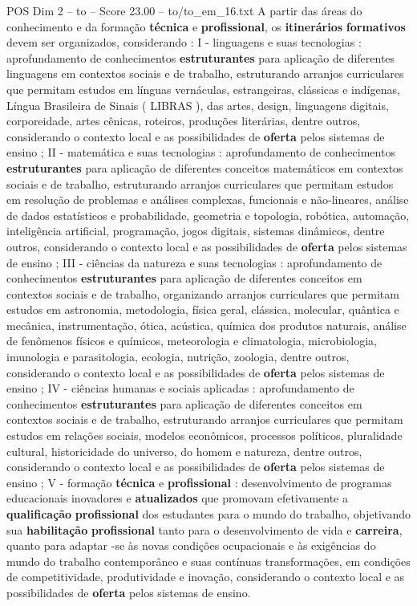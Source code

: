 \begin{textsample}{POS Dim 2 – to – Score 23.00 – to/to\_em\_16.txt}
A partir das áreas do conhecimento e da formação \textbf{técnica} e \textbf{profissional}, os \textbf{itinerários} \textbf{formativos} devem ser organizados, considerando : I - linguagens e suas tecnologias : aprofundamento de conhecimentos \textbf{estruturantes} para aplicação de diferentes linguagens em contextos sociais e de trabalho, estruturando arranjos curriculares que permitam estudos em línguas vernáculas, estrangeiras, clássicas e indígenas, Língua Brasileira de Sinais ( LIBRAS ), das artes, design, linguagens digitais, corporeidade, artes cênicas, roteiros, produções literárias, dentre outros, considerando o contexto local e as possibilidades de \textbf{oferta} pelos sistemas de ensino ; II - matemática e suas tecnologias : aprofundamento de conhecimentos \textbf{estruturantes} para aplicação de diferentes conceitos matemáticos em contextos sociais e de trabalho, estruturando arranjos curriculares que permitam estudos em resolução de problemas e análises complexas, funcionais e não-lineares, análise de dados estatísticos e probabilidade, geometria e topologia, robótica, automação, inteligência artificial, programação, jogos digitais, sistemas dinâmicos, dentre outros, considerando o contexto local e as possibilidades de \textbf{oferta} pelos sistemas de ensino ; III - ciências da natureza e suas tecnologias : aprofundamento de conhecimentos \textbf{estruturantes} para aplicação de diferentes conceitos em contextos sociais e de trabalho, organizando arranjos curriculares que permitam estudos em astronomia, metodologia, física geral, clássica, molecular, quântica e mecânica, instrumentação, ótica, acústica, química dos produtos naturais, análise de fenômenos físicos e químicos, meteorologia e climatologia, microbiologia, imunologia e parasitologia, ecologia, nutrição, zoologia, dentre outros, considerando o contexto local e as possibilidades de \textbf{oferta} pelos sistemas de ensino ; IV - ciências humanas e sociais aplicadas : aprofundamento de conhecimentos \textbf{estruturantes} para aplicação de diferentes conceitos em contextos sociais e de trabalho, estruturando arranjos curriculares que permitam estudos em relações sociais, modelos econômicos, processos políticos, pluralidade cultural, historicidade do universo, do homem e natureza, dentre outros, considerando o contexto local e as possibilidades de \textbf{oferta} pelos sistemas de ensino ; V - formação \textbf{técnica} e \textbf{profissional} : desenvolvimento de programas educacionais inovadores e \textbf{atualizados} que promovam efetivamente a \textbf{qualificação} \textbf{profissional} dos estudantes para o mundo do trabalho, objetivando sua \textbf{habilitação} \textbf{profissional} tanto para o desenvolvimento de vida e \textbf{carreira}, quanto para adaptar -se às novas condições ocupacionais e às exigências do mundo do trabalho contemporâneo e suas contínuas transformações, em condições de competitividade, produtividade e inovação, considerando o contexto local e as possibilidades de \textbf{oferta} pelos sistemas de ensino.

\end{textsample}
